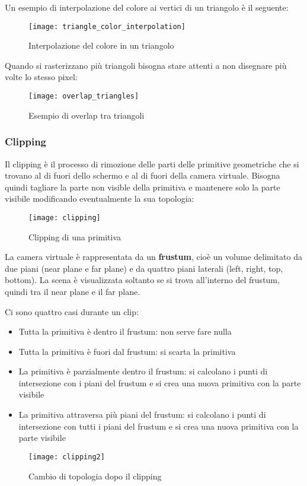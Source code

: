 \documentclass[a4paper]{article}
\begin{document}
\vspace{1em}
\noindent
Un esempio di interpolazione del colore ai vertici di un triangolo è il seguente:
\begin{figure}[H]
  \centering
  \texttt{[image: triangle\_color\_interpolation]}
  \caption{Interpolazione del colore in un triangolo}
\end{figure}

\vspace{1em}
\noindent
Quando si rasterizzano più triangoli bisogna stare attenti a non disegnare più volte
lo stesso pixel:
\begin{figure}[H]
  \centering
  \texttt{[image: overlap\_triangles]}
  \caption{Esempio di overlap tra triangoli}
\end{figure}

\subsubsection{Clipping}
Il clipping è il processo di rimozione delle parti delle primitive geometriche
che si trovano al di fuori dello schermo e al di fuori della camera virtuale. Bisogna
quindi tagliare la parte non visible della primitiva e mantenere solo la parte visibile
modificando eventualmente la sua topologia:
\begin{figure}[H]
  \centering
  \texttt{[image: clipping]}
  \caption{Clipping di una primitiva}
\end{figure}

La camera virtuale è rappresentata da un \textbf{frustum}, cioè un volume delimitato
da due piani (near plane e far plane) e da quattro piani laterali (left, right, top, bottom).
La scena è visualizzata soltanto se si trova all'interno del frustum, quindi tra il near
plane e il far plane.

\vspace{1em}
\noindent
Ci sono quattro casi durante un clip:
\begin{itemize}
  \item Tutta la primitiva è dentro il frustum: non serve fare nulla
  \item Tutta la primitiva è fuori dal frustum: si scarta la primitiva
  \item La primitiva è parzialmente dentro il frustum: si calcolano i punti di intersezione
    con i piani del frustum e si crea una nuova primitiva con la parte visibile
  \item La primitiva attraversa più piani del frustum: si calcolano i punti di intersezione
    con tutti i piani del frustum e si crea una nuova primitiva con la parte visibile
\end{itemize}
\begin{figure}[H]
  \centering
  \texttt{[image: clipping2]}
  \caption{Cambio di topologia dopo il clipping}
\end{figure}
\end{document}
